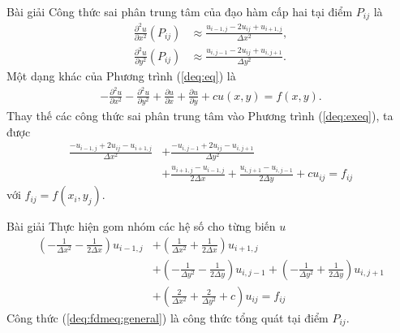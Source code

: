 \documentclass[9pt]{beamer}
\numberwithin{equation}{section}
\begin{document}
\begin{frame}
\begin{exampleblock}{Bài giải}
    Công thức sai phân trung tâm của đạo hàm cấp hai tại điểm $P_{ij}$ là
    \begin{align*}
        \frac{\partial^2 u}{\partial x^2}(P_{ij})
        &\approx \frac{u_{i-1,j} - 2 u_{ij} + u_{i+1,j}}{\Delta x^2}, \\
        \frac{\partial^2 u}{\partial y^2}(P_{ij})
        &\approx \frac{u_{i,j-1} - 2 u_{ij} + u_{i,j+1}}{\Delta y^2}.
    \end{align*}
    Một dạng khác của Phương trình (\ref{deq:eq}) là
    \begin{align}
        -\frac{\partial^2 u}{\partial x^2} - \frac{\partial^2 u}{\partial y^2} + \frac{\partial u}{\partial x} + \frac{\partial u}{\partial y} + c u(x,y) = f(x,y) .\label{deq:exeq}
    \end{align}
    Thay thế các công thức sai phân trung tâm vào Phương trình (\ref{deq:exeq}), ta được
    \begin{align}
        \frac{-u_{i-1,j} + 2u_{ij} - u_{i+1,j}}{\Delta x^2} &+ \frac{-u_{i,j-1} + 2u_{ij} - u_{i,j+1}}{\Delta y^2} \nonumber \\
        &+ \frac{u_{i+1,j} - u_{i-1,j}}{2 \Delta x} + \frac{u_{i,j+1} - u_{i,j-1}}{2 \Delta y} + c u_{ij} = f_{ij} \label{deq:fdmeq}
    \end{align}
    với $f_{ij} = f(x_i, y_j)$.
\end{exampleblock}
\end{frame}

\begin{frame}
\begin{exampleblock}{Bài giải}
    Thực hiện gom nhóm các hệ số cho từng biến $u$
    \begin{align}
        \left(-\frac{1}{\Delta x^2} - \frac{1}{2 \Delta x}\right) u_{i-1,j} &+
        \left(\frac{1}{\Delta x^2} + \frac{1}{2 \Delta x}\right) u_{i+1,j} \nonumber \\&+
        \left(-\frac{1}{\Delta y^2} - \frac{1}{2 \Delta y}\right) u_{i,j-1} +
        \left(-\frac{1}{\Delta y^2} + \frac{1}{2 \Delta y}\right) u_{i,j+1} \nonumber \\&+
        \left(\frac{2}{\Delta x^2} + \frac{2}{\Delta y^2} + c\right) u_{ij} = f_{ij} \label{deq:fdmeq:general}
    \end{align}
    Công thức (\ref{deq:fdmeq:general}) là công thức tổng quát tại điểm $P_{ij}$.
\end{exampleblock}
\end{frame}
\end{document}
